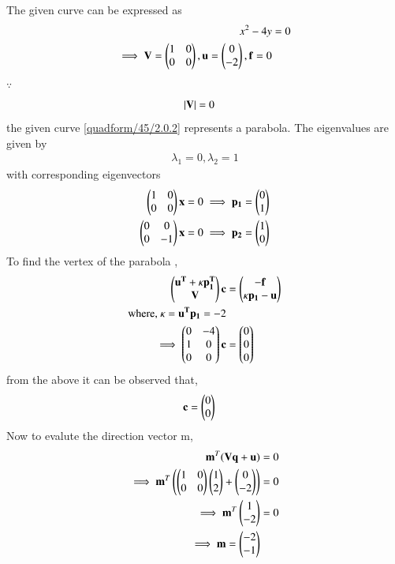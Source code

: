 The given curve can be expressed as 
\begin{align}
 x^2-4y &=0 \label{quadform/45/2.0.2}
 \\
\implies \mathbf{V}=\begin{pmatrix}1 & 0 \\ 0 & 0\end{pmatrix},\mathbf{u}=\begin{pmatrix}0 \\ -2 \end{pmatrix}, \mathbf{f} = 0 
\end{align}
$\because$
\begin{align}
 \left\vert\mathbf{V}\right\vert &= 0
\end{align}
the given curve \eqref{quadform/45/2.0.2} represents a parabola.
The eigenvalues are given by 
\begin{align}
\lambda_1 = 0 , \lambda_2 = 1
\end{align}
with corresponding eigenvectors
\begin{align}
\begin{pmatrix}1 & 0 \\ 0 & 0\end{pmatrix}\mathbf{x} &=0 \implies \mathbf{p_1} = \begin{pmatrix}0 \\ 1\end{pmatrix}
\\
\begin{pmatrix}0 & 0 \\ 0 & -1\end{pmatrix}\mathbf{x} &=0 \implies \mathbf{p_2} = \begin{pmatrix}1 \\ 0\end{pmatrix}
\end{align}
To find the vertex of the parabola ,
\begin{align} \begin{pmatrix}\mathbf{u^T}+\kappa\mathbf{p_1^T}\\\mathbf{V} \end{pmatrix}\mathbf{c} &= \begin{pmatrix}\mathbf{-f}\\\kappa \mathbf{p_1} -\mathbf{u}\end{pmatrix}
\\
\text{where, }  \kappa = \mathbf{u^T}\mathbf{p_1} = -2
\\
\implies\begin{pmatrix}0 & -4\\1 & 0 \\0 & 0\end{pmatrix} \mathbf{c}&= \begin{pmatrix}0\\0\\0\end{pmatrix} \label{quadform/45/eq:b}
\end{align}
from the above it can be observed that,
\begin{align}    
   \mathbf{c} &= \begin{pmatrix}0 \\ 0\end{pmatrix}
\end{align}
Now to evalute the direction vector m,
\begin{align}
\mathbf{m}^T(\mathbf{V}\mathbf{q} + \mathbf{u}) &=0
\\
\implies \mathbf{m}^T\left(\begin{pmatrix}1 & 0 \\ 0 & 0\end{pmatrix}\begin{pmatrix}1 \\ 2\end{pmatrix} + \begin{pmatrix}0 \\ -2\end{pmatrix}\right) &=0
\\
\implies \mathbf{m}^T\begin{pmatrix}1 \\ -2\end{pmatrix} &=0
\\
\implies \mathbf{m} = \begin{pmatrix}-2 \\ -1\end{pmatrix}
\end{align}
